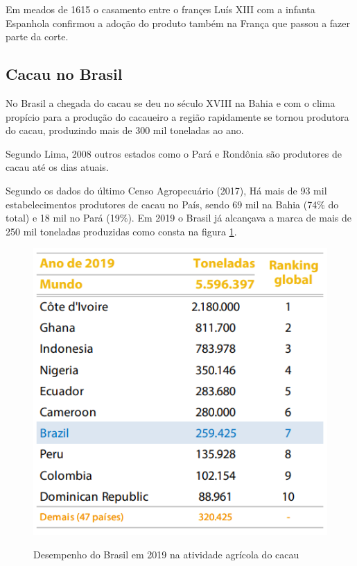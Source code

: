 \documentclass[
	12pt,				%
	openright,			%
	oneside,			%
	a4paper,			%
	english,			%
	french,				%
	spanish,			%
	brazil				%
	]{abntex2}
\begin{document}
Em meados de 1615 o casamento entre o françes Luís XIII com a infanta Espanhola confirmou a adoção do produto também na França que passou a fazer parte da corte.

\subsection{Cacau no Brasil}

No Brasil a chegada do cacau se deu no século XVIII na Bahia e com o clima propício para a produção do cacaueiro a região rapidamente se tornou produtora do cacau, produzindo mais de 300 mil toneladas ao ano. \cite{1} \cite{7}

Segundo Lima, 2008 outros estados como o Pará e Rondônia são produtores de cacau até os dias atuais.

Segundo os dados do último Censo Agropecuário (2017), Há mais de 93 mil estabelecimentos produtores de cacau no País, sendo 69 mil na Bahia (74$\%$ do total) e 18 mil no Pará (19$\%$). Em 2019 o Brasil já alcançava a marca de mais de 250 mil toneladas produzidas como consta na figura \ref{fig2}. \cite{7}

\begin{figure}[H]
\begin{center}
\caption{Desempenho do Brasil em 2019 na atividade agrícola do cacau}
\includegraphics[scale=0.8]{../../Pictures/tabela.png} 
\label{fig2}
\end{center}
\end{figure}
\end{document}
